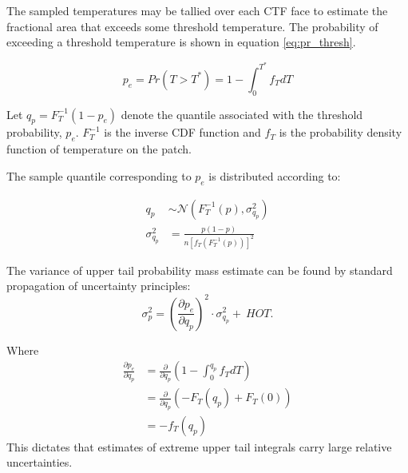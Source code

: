 The sampled temperatures may be tallied over each CTF face to estimate the fractional area that exceeds some threshold temperature.  The probability of exceeding a threshold temperature is shown in equation \ref{eq:pr_thresh}.

    \begin{equation}
    p_e = Pr(T > T^*) = 1 - \int_0^{T^*} f_T dT
    \label{eq:pr_thresh}
    \end{equation}

    Let $q_p = F_T^{-1}(1 - p_e)$
    denote the quantile associated with the threshold probability, $p_e$.
    $F_T^{-1}$ is the inverse CDF function and $f_T$ is the probability density function of temperature on the patch.

    The sample quantile corresponding to $p_e$ is distributed according to:

   \begin{eqnarray}
    q_p &\sim \mathcal N \left( F_T^{-1}(p), \sigma^2_{q_p} \right) \\
    \sigma^2_{q_p} &= \frac{p(1 - p)}{n[f_T(F_T^{-1}(p))]^2}
    \end{eqnarray}

    The variance of upper tail probability mass estimate can be found by standard propagation of uncertainty principles:
   \begin{equation}
    \sigma_p^2 = \left(\frac{\partial p_e}{\partial q_p} \right)^2 \cdot \sigma_{q_p}^2 +\  HOT.
    \label{eq:pr_thresh_uncert}
    \end{equation}

    Where
   \begin{eqnarray}
    \frac{\partial p_e}{\partial q_p} &= \frac{\partial}{\partial q_p} \left( 1 - \int_0^{q_p} f_T dT \right) \nonumber \\
    &= \frac{\partial}{\partial q_p} \left( -F_T(q_p) + F_T(0) \right) \nonumber \\
    &= -f_T(q_p)
    \end{eqnarray}
    This dictates that estimates of extreme upper tail integrals carry large relative uncertainties.



